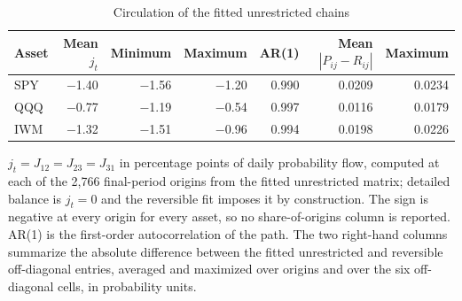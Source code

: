 \begin{table}[!htbp]\centering\small\setlength{\tabcolsep}{7pt}
\caption{Circulation of the fitted unrestricted chains}\label{tab:circulation}
\begin{tabular}{lrrrrrr}\toprule
Asset & Mean $j_t$ & Minimum & Maximum & AR(1) & Mean $|P_{ij}-R_{ij}|$ & Maximum\\\midrule
SPY & $-$1.40 & $-$1.56 & $-$1.20 & 0.990 & 0.0209 & 0.0234\\
QQQ & $-$0.77 & $-$1.19 & $-$0.54 & 0.997 & 0.0116 & 0.0179\\
IWM & $-$1.32 & $-$1.51 & $-$0.96 & 0.994 & 0.0198 & 0.0226\\
\bottomrule\end{tabular}
\par\smallskip\parbox{0.98\linewidth}{\footnotesize $j_t=J_{12}=J_{23}=J_{31}$ in percentage points of daily probability flow, computed at each of the 2,766 final-period origins from the fitted unrestricted matrix; detailed balance is $j_t=0$ and the reversible fit imposes it by construction. The sign is negative at every origin for every asset, so no share-of-origins column is reported. AR(1) is the first-order autocorrelation of the path. The two right-hand columns summarize the absolute difference between the fitted unrestricted and reversible off-diagonal entries, averaged and maximized over origins and over the six off-diagonal cells, in probability units.}
\end{table}
